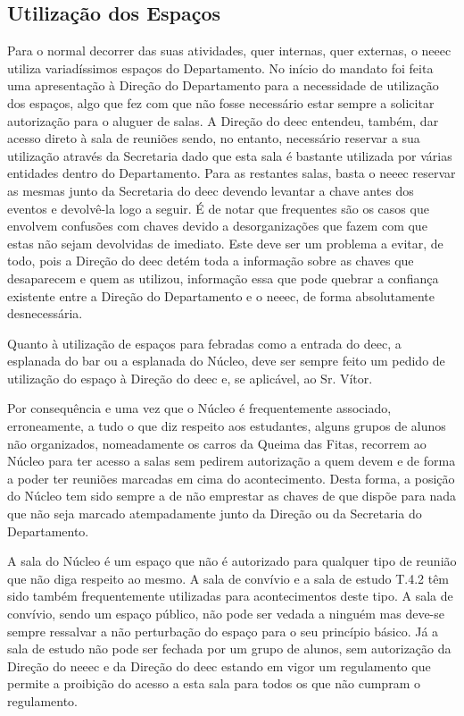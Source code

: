 
\subsection{Utilização dos Espaços}

Para o normal decorrer das suas atividades, quer internas, quer externas, o \acrshort{neeec} utiliza variadíssimos espaços do Departamento. No início do mandato foi feita uma apresentação à Direção do Departamento para a necessidade de utilização dos espaços, algo que fez com que não fosse necessário estar sempre a solicitar autorização para o aluguer de salas. A Direção do \acrshort{deec} entendeu, também, dar acesso direto à sala de reuniões sendo, no entanto, necessário reservar a sua utilização através da Secretaria dado que esta sala é bastante utilizada por várias entidades dentro do Departamento. Para as restantes salas, basta o \acrshort{neeec} reservar as mesmas junto da Secretaria do \acrshort{deec} devendo levantar a chave antes dos eventos e devolvê-la logo a seguir. É de notar que frequentes são os casos que envolvem confusões com chaves devido a desorganizações que fazem com que estas não sejam devolvidas de imediato. Este deve ser um problema a evitar, de todo, pois a Direção do \acrshort{deec} detém toda a informação sobre as chaves que desaparecem e quem as utilizou, informação essa que pode quebrar a confiança existente entre a Direção do Departamento e o \acrshort{neeec}, de forma absolutamente desnecessária.

Quanto à utilização de espaços para febradas como a entrada do \acrshort{deec}, a esplanada do bar ou a esplanada do Núcleo, deve ser sempre feito um pedido de utilização do espaço à Direção do \acrshort{deec} e, se aplicável, ao Sr. Vítor.

Por consequência e uma vez que o Núcleo é frequentemente associado, erroneamente, a tudo o que diz respeito aos estudantes, alguns grupos de alunos não organizados, nomeadamente os carros da Queima das Fitas, recorrem ao Núcleo para ter acesso a salas sem pedirem autorização a quem devem e de forma a poder ter reuniões marcadas em cima do acontecimento. Desta forma, a posição do Núcleo tem sido sempre a de não emprestar as chaves de que dispõe para nada que não seja marcado atempadamente junto da Direção ou da Secretaria do Departamento.

A sala do Núcleo é um espaço que não é autorizado para qualquer tipo de reunião que não diga respeito ao mesmo. A sala de convívio e a sala de estudo T.4.2 têm sido também frequentemente utilizadas para acontecimentos deste tipo. A sala de convívio, sendo um espaço público, não pode ser vedada a ninguém mas deve-se sempre ressalvar a não perturbação do espaço para o seu princípio básico. Já a sala de estudo não pode ser fechada por um grupo de alunos, sem autorização da Direção do \acrshort{neeec} e da Direção do \acrshort{deec} estando em vigor um regulamento que permite a proibição do acesso a esta sala para todos os que não cumpram o regulamento.


